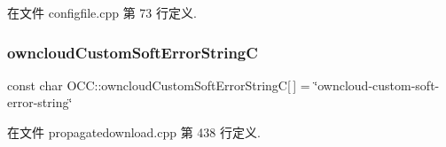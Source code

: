 在文件 configfile.\+cpp 第 73 行定义.

\mbox{\label{namespace_o_c_c_a06454c945d2ad9885d1e6a21ea344892}} 
\subsubsection{\texorpdfstring{owncloud\+Custom\+Soft\+Error\+StringC}{owncloudCustomSoftErrorStringC}}
{\footnotesize\ttfamily const char O\+C\+C\+::owncloud\+Custom\+Soft\+Error\+StringC\mbox{[}$\,$\mbox{]} = \char`\"{}owncloud-\/custom-\/soft-\/error-\/string\char`\"{}}



在文件 propagatedownload.\+cpp 第 438 行定义.

